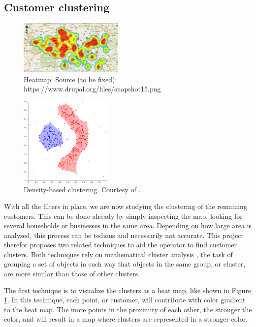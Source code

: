 \documentclass[twocolumn]{article}
\begin{document}
\subsection{Customer clustering}
\label{sub:Customer clustering}
\begin{figure}
  \centering
  \includegraphics[width=0.45\textwidth]{img/heatmap.png}
  \caption{Heatmap: Source (to be fixed): https://www.drupal.org/files/snapshot15.png}
  \label{fig:heatmap}
\end{figure}
\begin{figure}
  \centering
  \includegraphics[width=0.40\textwidth]{img/dbscan.png}
  \caption{Density-based clustering. Courtesy of \cite{Wikipedia_contributors2014-qv}.}
  \label{fig:dbscan}
\end{figure}
With all the filters in place, we are now studying the clustering of the remaining customers. This can be done already by simply inspecting the map, looking for several households or businesses in the same area. Depending on how large area is analysed, this process can be tedious and necessarily not accurate. This project therefor proposes two related techniques to aid the operator to find customer clusters. Both techniques rely on mathematical cluster analysis \cite{Wikipedia_contributors2014-qv}, the task of grouping a set of objects in such way that objects in the same group, or cluster, are more similar than those of other clusters.

The first technique is to visualize the clusters as a heat map, like shown in Figure \ref{fig:heatmap}. In this technique, each point, or customer, will contribute with color gradient to the heat map. The more points in the proximity of each other, the stronger the color, and will result in a map where clusters are represented in a stronger color.
\end{document}
